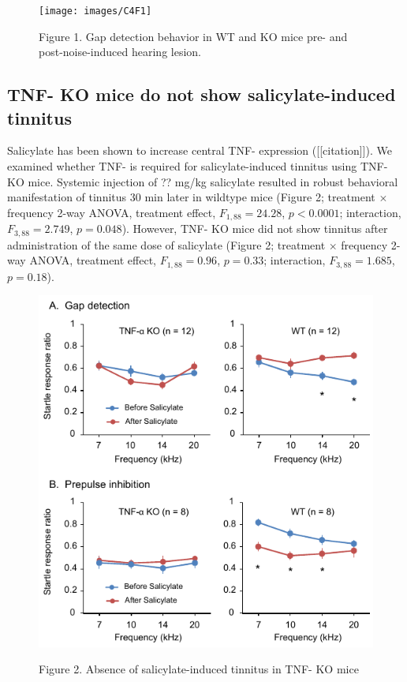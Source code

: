 \begin{figure}[h]
	\centering
		\texttt{[image: images/C4F1]}
	\begin{changemargin}{1in}{1in}
	\footnotesize{Figure 1. Gap detection behavior in WT and KO mice pre- and post-noise-induced hearing lesion.}
	\end{changemargin}
\end{figure}

\subsection{TNF-\textalpha{} KO mice do not show salicylate-induced tinnitus}

Salicylate has been shown to increase central TNF-\textalpha{} expression ([[citation]]). We examined whether TNF-\textalpha{} is required for salicylate-induced tinnitus using TNF-\textalpha{} KO mice. Systemic injection of ?? mg/kg salicylate resulted in robust behavioral manifestation of tinnitus 30 min later in wildtype mice (Figure 2; treatment $\times$ frequency 2-way ANOVA, treatment effect, $F_{1,88}=24.28$, $p<0.0001$; interaction, $F_{3,88}=2.749$, $p=0.048$). However, TNF-\textalpha{} KO mice did not show tinnitus after administration of the same dose of salicylate (Figure 2; treatment $\times$ frequency 2-way ANOVA, treatment effect, $F_{1,88}=0.96$, $p=0.33$; interaction, $F_{3,88}=1.685$, $p=0.18$).

\begin{figure}[h]
	\centering
		\includegraphics[width=4.5in]{images/C4F2}
	\begin{changemargin}{1in}{1in}
	\footnotesize{Figure 2. Absence of salicylate-induced tinnitus in TNF-\textalpha{} KO mice}
	\end{changemargin}
\end{figure}


